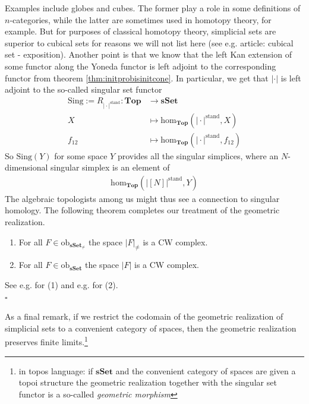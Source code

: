 Examples include globes and cubes.
The former play a role in some definitions of $n$-categories, while the latter are sometimes used in homotopy theory, for example.
But for purposes of classical homotopy theory, simplicial sets are superior to cubical sets for reasons we will not list here (see e.g. \cite{wiki-nlab0000} article: cubical set - exposition).
Another point is that we know that the left Kan extension of some functor along the Yoneda functor is left adjoint to the corresponding functor from theorem \ref{thm:initprobisinitcone}.
In particular, we get that $\vert \cdot \vert$ is left adjoint to the so-called singular set functor
\begin{align*}
  \mathrm{Sing}
  :=
  R_{\vert \cdot \vert^{\textrm{stand}}}
  \colon
  \mathbf{Top}
  &\rightarrow
  \mathbf{sSet}
  \\
  X
  &\mapsto
  \mathrm{hom}_{\mathbf{Top}}
  \left(
    \vert
      \cdot
    \vert^{\textrm{stand}},
    X
  \right)
  \\
  f_{12}
  &\mapsto
  \mathrm{hom}_{\mathbf{Top}}
  \left(
    \vert
      \cdot
    \vert^{\textrm{stand}},
    f_{12}
  \right)
\end{align*}
So $\mathrm{Sing}(Y)$ for some space $Y$ provides all the singular simplices, where an $N$-dimensional singular simplex is an element of
\begin{align*}
  \mathrm{hom}_{\mathbf{Top}}
  \left(
    \left\vert
      [N]
    \right\vert^{\textrm{stand}},
    Y
  \right)
\end{align*}
The algebraic topologists among us might thus see a connection to singular homology.
The following theorem completes our treatment of the geometric realization.
\\
\begin{thm}
\label{thm:ssetcwcompex}
\begin{enumerate}
\item[(1)]
For all $F \in \mathrm{ob}_{\mathbf{sSet}_{\neq}}$ the space $\vert F \vert_{\neq}$ is a CW complex.
\item[(2)]
For all $F \in \mathrm{ob}_{\mathbf{sSet}}$ the space $\vert F \vert$ is a CW complex.
\end{enumerate}
\end{thm}
\begin{prf}
See e.g. \cite{8b5861fc} for (1) and e.g. \cite{b28b8d8f} for (2).
\\
\phantom{proven}
\hfill
$\square$
\end{prf}
As a final remark, if we restrict the codomain of the geometric realization of simplicial sets to a convenient category of spaces, then the geometric realization preserves finite limits.\footnote{in topos language: if $\mathbf{sSet}$ and the convenient category of spaces are given a topoi structure the geometric realization together with the singular set functor is a so-called \textit{geometric morphism}}
